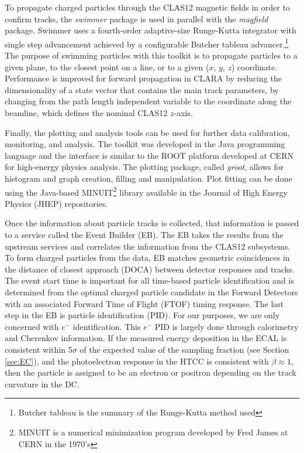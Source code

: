 To propagate charged particles through the CLAS12 magnetic fields in order to confirm tracks, the \textit{swimmer} package is used in parallel with the \textit{magfield} package. Swimmer uses a fourth-order adaptive-size Runge-Kutta integrator with single step advancement achieved by a configurable Butcher tableau advancer.\footnote{Butcher tableau is the summary of the Runge-Kutta method used} The purpose of swimming particles with this toolkit is to propagate particles to a given plane, to the closest point on a line, or to a given ($x$, $y$, $z$) coordinate. Performance is improved for forward propagation in CLARA by reducing the dimensionality of a state vector that contains the main track parameters, by changing from the path length independent variable to the coordinate along the beamline, which defines the nominal CLAS12 $z$-axis.

Finally, the plotting and analysis tools can be used for further data calibration, monitoring, and analysis. The toolkit was developed in the Java programming language and the interface is similar to the ROOT platform developed at CERN for high-energy physics analysis. The plotting package, called \textit{groot}, allows for histogram and graph creation, filling and manipulation. Plot fitting can be done using the Java-based MINUIT\footnote{MINUIT is a numerical minimization program developed by Fred James at CERN in the 1970's} library available in the Journal of High Energy Physics (JHEP) repositories.

Once the information about particle tracks is collected, that information is passed to a service called the Event Builder (EB). The EB takes the results from the upstream services and correlates the information from the CLAS12 subsystems. To form charged particles from the data, EB matches geometric coincidences in the distance of closest approach (DOCA) between detector responses and tracks. The event start time is important for all time-based particle identification and is determined from the optimal charged particle candidate in the Forward Detectors with an associated Forward Time of Flight (FTOF) timing response. The last step in the EB is particle identification (PID). For our purposes, we are only concerned with $e^-$ identification. This $e^-$ PID is largely done through calorimetry and Cherenkov information. If the measured energy deposition in the ECAL is consistent within 5$\sigma$ of the expected value of the sampling fraction (see Section \ref{sec:EC}), and the photoelectron response in the HTCC is consistent with $\beta \approx 1$, then the particle is assigned to be an electron or positron depending on the track curvature in the DC.   

